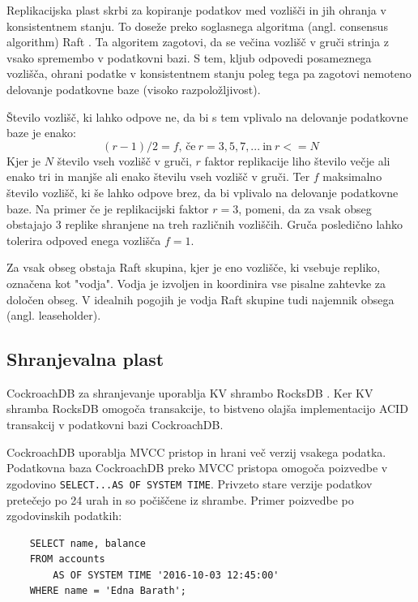 \documentclass[a4paper, 12pt]{book}
\begin{document}
Replikacijska plast skrbi za kopiranje podatkov med vozlišči in jih ohranja v konsistentnem stanju. To doseže preko soglasnega algoritma (angl. consensus algorithm) Raft \cite{raft-vs-paxos}. Ta algoritem zagotovi, da se večina vozlišč v gruči strinja z vsako spremembo v podatkovni bazi. S tem, kljub odpovedi posameznega vozlišča, ohrani podatke v konsistentnem stanju poleg tega pa zagotovi nemoteno delovanje podatkovne baze (visoko razpoložljivost).

Število vozlišč, ki lahko odpove ne, da bi s tem vplivalo na delovanje podatkovne baze je enako:
\[(r - 1)/2 = f \text{, če}\ r = 3, 5, 7, ...\ \text{in}\ r <= N\]
Kjer je \(N\) število vseh vozlišč v gruči, \(r\) faktor replikacije liho število večje ali enako tri in manjše ali enako številu vseh vozlišč v gruči. Ter \(f\) maksimalno število vozlišč, ki še lahko odpove brez, da bi vplivalo na delovanje podatkovne baze. Na primer če je replikacijski faktor \(r = 3\), pomeni, da za vsak obseg obstajajo 3 replike shranjene na treh različnih vozliščih. Gruča posledično lahko tolerira odpoved enega vozlišča \(f = 1\).

Za vsak obseg obstaja Raft skupina, kjer je eno vozlišče, ki vsebuje repliko, označena kot "vodja". Vodja je izvoljen in koordinira vse pisalne zahtevke za določen obseg. V idealnih pogojih je vodja Raft skupine tudi najemnik obsega (angl. leaseholder).

\subsection{Shranjevalna plast}

CockroachDB za shranjevanje uporablja KV shrambo RocksDB \cite{rocksdb-home}. Ker KV shramba RocksDB omogoča transakcije, to bistveno olajša implementacijo ACID transakcij v podatkovni bazi CockroachDB.

CockroachDB uporablja MVCC pristop in hrani več verzij vsakega podatka. Podatkovna baza CockroachDB preko MVCC pristopa omogoča poizvedbe v zgodovino \texttt{SELECT...AS OF SYSTEM TIME}. Privzeto stare verzije podatkov pretečejo po 24 urah in so počiščene iz shrambe. Primer poizvedbe po zgodovinskih podatkih:

\begin{listing}[H]
\begin{verbatim}
    SELECT name, balance
    FROM accounts
        AS OF SYSTEM TIME '2016-10-03 12:45:00'
    WHERE name = 'Edna Barath';
\end{verbatim}
\label{sql-example-as-of-system-time}
\end{listing}
\end{document}
